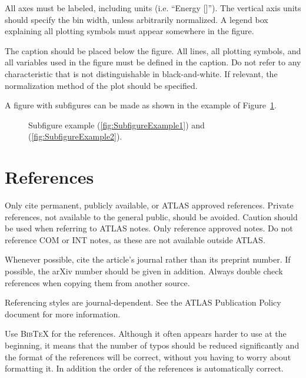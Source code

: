 \documentclass[coverpage]{style/atlasdoc}
\newcommand{\BibTeX}{\textsc{Bib\TeX}}
\begin{document}
All axes must be labeled, including units (i.e. ``Energy [\gev]'').
The vertical axis units should specify the bin width, unless
arbitrarily normalized. A legend box explaining all plotting symbols
must appear somewhere in the figure.

The caption should be placed below the figure.  All lines, all
plotting symbols, and all variables used in the figure must be defined
in the caption. Do not refer to any characteristic that is not
distinguishable in black-and-white.  If relevant, the normalization
method of the plot should be specified.

A figure with subfigures can be made as shown in the example of
Figure~\ref{fig:subfigexample}.

\begin{figure}
  \centering
  \caption{Subfigure example (\ref{fig:SubfigureExample1}) and
    (\ref{fig:SubfigureExample2}).}
  \label{fig:subfigexample}
\end{figure}


\section{References}
\label{sec:refs}

Only cite permanent, publicly available, or ATLAS approved references.
Private references, not available to the general public, should be
avoided. Caution should be used when referring to ATLAS notes.
Only reference approved notes. Do not reference COM or INT notes,
as these are not available outside ATLAS.

Whenever possible, cite the article's journal rather than its preprint number. 
If possible, the arXiv number should be given in addition.
Always double check references when copying them from another source.

Referencing styles are journal-dependent. See the ATLAS Publication
Policy document for more information.

Use \BibTeX{} for the references. Although it often
appears harder to use at the beginning, it means that the number of
typos should be reduced significantly and the format of the references
will be correct, without you having to worry about formatting it. In
addition the order of the references is automatically correct.
\end{document}
